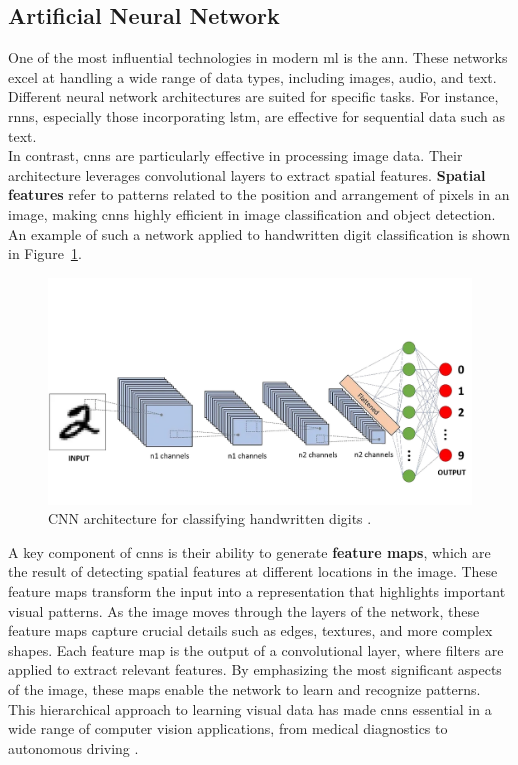 \subsection{Artificial Neural Network}

One of the most influential technologies in modern \gls{ml} is the \gls{ann}. These networks excel at handling a wide range of data types, including images, audio, and text. Different neural network architectures are suited for specific tasks. For instance, \glspl{rnn}, especially those incorporating \gls{lstm}, are effective for sequential data such as text. \\

In contrast, \glspl{cnn} are particularly effective in processing image data. Their architecture leverages convolutional layers to extract spatial features. \textbf{Spatial features} refer to patterns related to the position and arrangement of pixels in an image, making \glspl{cnn} highly efficient in image classification and object detection. An example of such a network applied to handwritten digit classification is shown in Figure~\ref{fig:convolutional-neural-network}.  \\

\begin{figure}[h!] \centering \includegraphics[width=0.75\linewidth]{figures/theory/machine-learning/convolutional-neural-network.png} \caption[CNN architecture for handwritten digit classification]{CNN architecture for classifying handwritten digits \cite{medium:cnn}.} \label{fig:convolutional-neural-network} \end{figure}

A key component of \glspl{cnn} is their ability to generate \textbf{feature maps}, which are the result of detecting spatial features at different locations in the image. These feature maps transform the input into a representation that highlights important visual patterns. As the image moves through the layers of the network, these feature maps capture crucial details such as edges, textures, and more complex shapes. Each feature map is the output of a convolutional layer, where filters are applied to extract relevant features. By emphasizing the most significant aspects of the image, these maps enable the network to learn and recognize patterns. This hierarchical approach to learning visual data has made \glspl{cnn} essential in a wide range of computer vision applications, from medical diagnostics to autonomous driving \cite{encord:cnn}. \\


